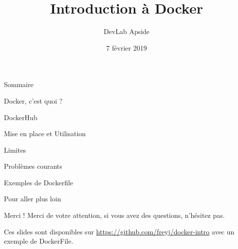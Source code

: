 \documentclass{beamer}
\title{Introduction à Docker}
\subtitle{DevLab Apside}
\date{7 février 2019}
\begin{document}
\begin{frame}
  \titlepage
\end{frame}

\begin{frame}{Sommaire}
\tableofcontents
\end{frame}

\begin{section}{Docker, c'est quoi ?}

\end{section}

\begin{section}{DockerHub}

\end{section}

\begin{section}{Mise en place et Utilisation}

\end{section}
\begin{section}{Limites}

\end{section}
\begin{section}{Problèmes courants}

\end{section}
\begin{section}{Exemples de Dockerfile}

\end{section}

\begin{section}{Pour aller plus loin}



\end{section}

\begin{frame}{Merci !}
    Merci de votre attention, si vous avez des questions, n'hésitez pas.
    
    Ces slides sont disponibles sur \href{https://github.com/freyj/}{https://github.com/freyj/docker-intro} 
    avec un exemple de DockerFile.
\end{frame}


\end{document}
